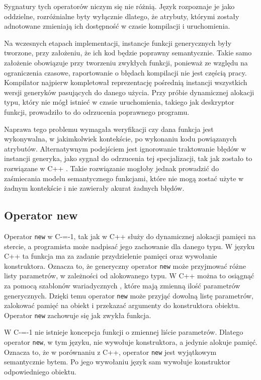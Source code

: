 Sygnatury tych operatorów niczym się nie różnią.
Język rozpoznaje je jako oddzielne, rozróżnialne byty wyłącznie dlatego, że atrybuty, którymi zostały adnotowane zmieniają ich dostępność w czasie kompilacji i uruchomienia.

Na wczesnych etapach implementacji, instancje funkcji generycznych były tworzone, przy założeniu, że ich kod będzie poprawny semantycznie.
Takie samo założenie obowiązuje przy tworzeniu zwykłych funkcji, ponieważ ze względu na ograniczenia czasowe, raportowanie o błędach kompilacji nie jest częścią pracy.
Kompilator najpierw kompletował reprezentację pośrednią instancji wszystkich wersji generyków pasujących do danego użycia.
Przy próbie dynamicznej alokacji typu, który nie mógł istnieć w czasie uruchomienia, takiego jak deskryptor funkcji, prowadziło to do odrzucenia poprawnego programu.

Naprawa tego problemu wymagała weryfikacji czy dana funkcja jest wykonywalna, w jakimkolwiek kontekście, po wykonaniu kodu powiązanych atrybutów.
Alternatywnym podejściem jest ignorowanie traktowanie błędów w instancji generyka, jako sygnał do odrzucenia tej specjalizacji, tak jak zostało to rozwiązane w C++ \cite{cppTemplatesCompleteGuide}.
Takie rozwiązanie mogłoby jednak prowadzić do zaśmiecania modelu semantycznego funkcjami, które nie mogą zostać użyte w żadnym kontekście i nie zawierały akurat żadnych błędów.

\subsection{Operator new}
\label{operator_new}
Operator \lstinline{new} w C-=-1, tak jak w C++ służy do dynamicznej alokacji pamięci na stercie, a programista może nadpisać jego zachowanie dla danego typu.
W języku C++ ta funkcja ma za zadanie przydzielenie pamięci oraz wywołanie konstruktora.
Oznacza to, że generyczny operator \lstinline{new} może przyjmować różne listy parametrów, w zależności od alokowanego typu.
W C++ można to osiągnąć za pomocą szablonów wariadycznych \cite{gregor2007variadic}, które mają zmienną ilość parametrów generycznych.
Dzięki temu operator \lstinline{new} może przyjąć dowolną listę parametrów, zalokować pamięć na obiekt i przekazać argumenty do konstruktora obiektu.
Operator \lstinline{new} zachowuje się jak zwykła funkcja.

W C-=-1 nie istnieje koncepcja funkcji o zmiennej liście parametrów.
Dlatego operator \lstinline{new}, w tym języku, nie wywołuje konstruktora, a jedynie alokuje pamięć.
Oznacza to, że w porównaniu z C++, operator \lstinline{new} jest wyjątkowym semantycznie bytem.
Po jego wywołaniu język sam wywołuje konstruktor odpowiedniego obiektu.

